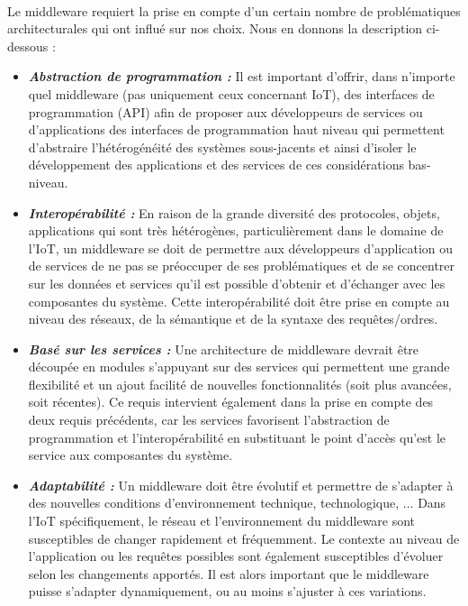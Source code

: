 \paragraph{}
Le middleware requiert la prise en compte d'un certain nombre de problématiques architecturales qui ont influé sur nos choix. Nous en donnons la description ci-dessous :\\
\begin{itemize}
\item \textbf{\textit{Abstraction de programmation :}} Il est important d'offrir, dans n'importe quel middleware (pas uniquement ceux concernant IoT), des interfaces de programmation (API) afin de proposer aux développeurs de services ou d'applications des interfaces de programmation haut niveau qui permettent d'abstraire l'hétérogénéité des systèmes sous-jacents et ainsi d'isoler le développement des applications et des services de ces considérations bas-niveau.\\
\item \textbf{\textit{Interopérabilité :}} En raison de la grande diversité des protocoles, objets, applications qui sont très hétérogènes, particulièrement dans le domaine de l'IoT, un middleware se doit de permettre aux développeurs d'application ou de services de ne pas se préoccuper de ses problématiques et de se concentrer sur les données et services qu'il est possible d'obtenir et d'échanger avec les composantes du système. Cette interopérabilité doit être prise en compte au niveau des réseaux, de la sémantique et de la syntaxe des requêtes/ordres.\\
\item \textbf{\textit{Basé sur les services :}} Une architecture de middleware devrait être découpée en modules s'appuyant sur des services qui permettent une grande flexibilité et un ajout facilité de nouvelles fonctionnalités (soit plus avancées, soit récentes). Ce requis intervient également dans la prise en compte des deux requis précédents, car les services favorisent l'abstraction de programmation et l'interopérabilité en substituant le point d'accès qu'est le service aux composantes du système.\\
\item \textbf{\textit{Adaptabilité :}} Un middleware doit être évolutif et permettre de s'adapter à des nouvelles conditions d'environnement technique, technologique, ... Dans l'IoT spécifiquement, le réseau et l'environnement du middleware sont susceptibles de changer rapidement et fréquemment. Le contexte au niveau de l'application ou les requêtes possibles sont également susceptibles d'évoluer selon les changements apportés. Il est alors important que le middleware puisse s'adapter dynamiquement, ou au moins s'ajuster à ces variations.\\

\end{itemize}

